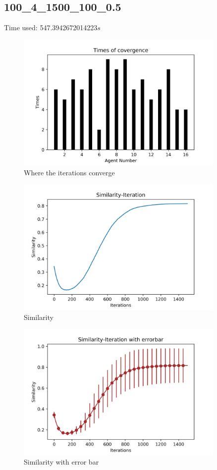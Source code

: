 \documentclass[a4paper,12pt]{article}
\begin{document}
    \subsection{100\_4\_1500\_100\_0.5}
    Time used: 547.3942672014223${s}$
    \begin{figure}[H]
    	\centering
    	\includegraphics[width=0.9\textwidth]{agt100_4_1500_100_5}
    	\caption{Where the iterations converge}\label{agt100_4_1500_100_5_h}
    \end{figure}
    \begin{figure}[H]
    	\centering
    	\includegraphics[width=0.9\textwidth]{Sim100_4_1500_100_5}
    	\caption{Similarity}\label{Sim100_4_1500_100_5_h}
    \end{figure}
    \begin{figure}[H]
    	\centering
    	\includegraphics[width=0.9\textwidth]{SimErr100_4_1500_100_5}
    	\caption{Similarity with error bar}\label{SimErr100_4_1500_100_5_h}
    \end{figure}
\end{document}
